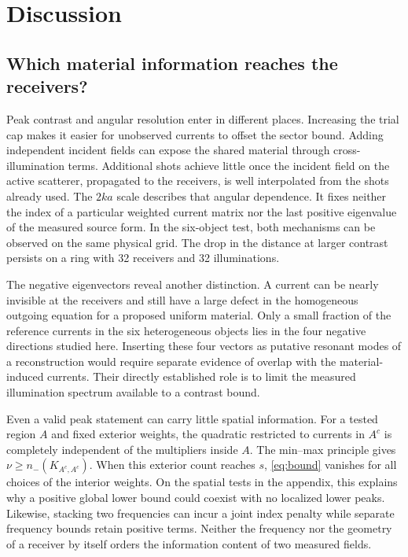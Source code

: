 \documentclass[anonymous,12pt]{iopjournal}
\numberwithin{equation}{section}
\begin{document}


\section{Discussion}\label{sec:discuss}

\subsection{Which material information reaches the receivers?}
Peak contrast and angular resolution enter in different places. Increasing the trial cap makes it easier for unobserved currents to offset the sector bound. Adding independent incident fields can expose the shared material through cross-illumination terms. Additional shots achieve little once the incident field on the active scatterer, propagated to the receivers, is well interpolated from the shots already used. The $2ka$ scale describes that angular dependence. It fixes neither the index of a particular weighted current matrix nor the last positive eigenvalue of the measured source form. In the six-object test, both mechanisms can be observed on the same physical grid. The drop in the distance at larger contrast persists on a ring with 32 receivers and 32 illuminations.

The negative eigenvectors reveal another distinction. A current can be nearly invisible at the receivers and still have a large defect in the homogeneous outgoing equation for a proposed uniform material. Only a small fraction of the reference currents in the six heterogeneous objects lies in the four negative directions studied here. Inserting these four vectors as putative resonant modes of a reconstruction would require separate evidence of overlap with the material-induced currents. Their directly established role is to limit the measured illumination spectrum available to a contrast bound.

Even a valid peak statement can carry little spatial information. For a tested region $A$ and fixed exterior weights, the quadratic restricted to currents in $A^c$ is completely independent of the multipliers inside $A$. The min--max principle gives $\nu\ge n_-(K_{A^c,A^c})$. When this exterior count reaches $s$, \eqref{eq:bound} vanishes for all choices of the interior weights. On the spatial tests in the appendix, this explains why a positive global lower bound could coexist with no localized lower peaks. Likewise, stacking two frequencies can incur a joint index penalty while separate frequency bounds retain positive terms. Neither the frequency nor the geometry of a receiver by itself orders the information content of two measured fields.
\end{document}
